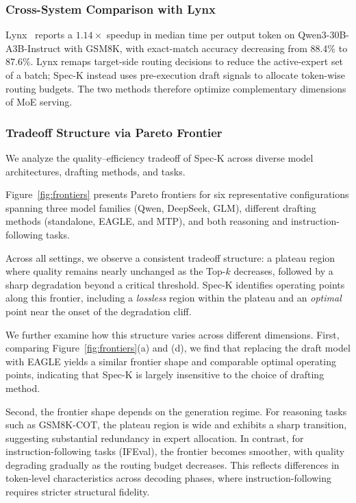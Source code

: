 \documentclass[conference]{IEEEtran}
\theoremstyle{definition} %
\begin{document}
\subsubsection{Cross-System Comparison with Lynx}

Lynx~\cite{gupta2024lynx} reports a $1.14\times$ speedup in median time per output token on Qwen3-30B-A3B-Instruct with GSM8K, with exact-match accuracy decreasing from 88.4\% to 87.6\%. Lynx remaps target-side routing decisions to reduce the active-expert set of a batch; Spec-K instead uses pre-execution draft signals to allocate token-wise routing budgets. The two methods therefore optimize complementary dimensions of MoE serving.

\subsubsection{Tradeoff Structure via Pareto Frontier} \label{sec:evaluation:pareto}

We analyze the quality--efficiency tradeoff of Spec-K across diverse model architectures, drafting methods, and tasks.

Figure~\ref{fig:frontiers} presents Pareto frontiers for six representative configurations spanning three model families (Qwen, DeepSeek, GLM), different drafting methods (standalone, EAGLE, and MTP), and both reasoning and instruction-following tasks.

Across all settings, we observe a consistent tradeoff structure: a plateau region where quality remains nearly unchanged as the Top-$k$ decreases, followed by a sharp degradation beyond a critical threshold. 
Spec-K identifies operating points along this frontier, including a \emph{lossless} region within the plateau and an \emph{optimal} point near the onset of the degradation cliff.

We further examine how this structure varies across different dimensions. 
First, comparing Figure~\ref{fig:frontiers}(a) and (d), we find that replacing the draft model with EAGLE yields a similar frontier shape and comparable optimal operating points, indicating that Spec-K is largely insensitive to the choice of drafting method.

Second, the frontier shape depends on the generation regime. 
For reasoning tasks such as GSM8K-COT, the plateau region is wide and exhibits a sharp transition, suggesting substantial redundancy in expert allocation. 
In contrast, for instruction-following tasks (IFEval), the frontier becomes smoother, with quality degrading gradually as the routing budget decreases. 
This reflects differences in token-level characteristics across decoding phases, where instruction-following requires stricter structural fidelity.
\end{document}
